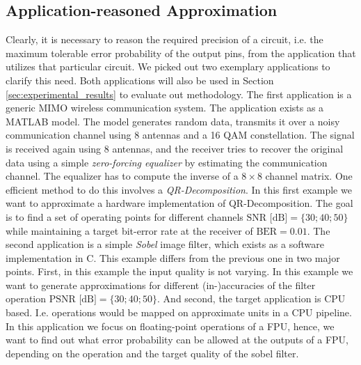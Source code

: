 \documentclass[conference]{IEEEtran}
\begin{document}
\subsection{Application-reasoned Approximation}
\label{subsec:application_reasoned}
Clearly, it is necessary to reason the required precision of a circuit, i.e. the maximum tolerable error probability of the output pins, from the application that utilizes that particular circuit. We picked out two exemplary applications to clarify this need. Both applications will also be used in Section \ref{sec:experimental_results} to evaluate out methodology. The first application is a generic MIMO wireless communication system. The application exists as a MATLAB model. The model generates random data, transmits it over a noisy communication channel using 8 antennas and a 16 QAM constellation. The signal is received again using 8 antennas, and the receiver tries to recover the original data using a simple \emph{zero-forcing equalizer} by estimating the communication channel. The equalizer has to compute the inverse of a $8\times8$ channel matrix. One efficient method to do this involves a \emph{QR-Decomposition}. In this first example we want to approximate a hardware implementation of QR-Decomposition. The goal is to find a set of operating points for different channels \mbox{$\textrm{SNR [dB]} = \{30; 40; 50\}$} while maintaining a target bit-error rate at the receiver of \mbox{$\textrm{BER}=0.01$}. The second application is a simple \emph{Sobel} image filter, which exists as a software implementation in C. This example differs from the previous one in two major points. First, in this example the input quality is not varying. In this example we want to generate approximations for different (in-)accuracies of the filter operation \mbox{$\textrm{PSNR [dB]} = \{30; 40; 50\}$}. And second, the target application is CPU based. I.e. operations would be mapped on approximate units in a CPU pipeline. In this application we focus on floating-point operations of a FPU, hence, we want to find out what error probability can be allowed at the outputs of a FPU, depending on the operation and the target quality of the sobel filter.
\end{document}
